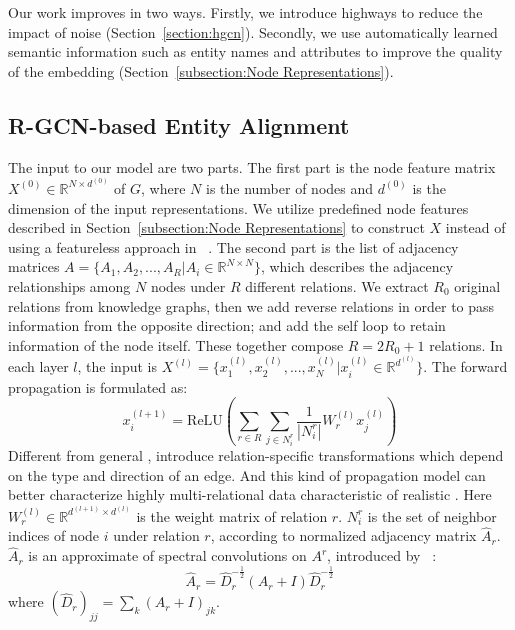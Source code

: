 Our work improves \RGCNs in two ways. Firstly, we introduce highways to reduce the impact of noise (Section~\ref{section:hgcn}).
    Secondly, we use automatically learned semantic information such as entity names and attributes to improve the quality of the \KG
    embedding (Section~\ref{subsection:Node Representations}).




	
	
	\subsection{R-GCN-based Entity Alignment}
	\label{section:rgcn}	

	The input to our \RGCN model are two parts. The first part is the node feature matrix $X^{(0)} \in \mathbb{R}^{N \times d^{(0)}}$ of $G$, where $N$ is the number of nodes and $d^{(0)}$ is the dimension of the input representations. We utilize predefined node features described in Section~\ref{subsection:Node Representations} to construct $X$ instead of using a featureless approach in \RGCNs~\cite{Schlichtkrull2017Modeling}.
	The second part is the list of adjacency matrices $A=\{A_1,A_2,...,A_R |A_i \in \mathbb{R}^{N \times N} \}$, which describes the adjacency relationships among $N$ nodes under $R$ different relations. We extract $R_0$ original relations from knowledge graphs, then we add reverse relations in order to pass information from the opposite direction; and add the self loop to retain information of the node itself. These together compose $R=2R_0+1$ relations.
	In each layer $l$, the input is $X^{(l)} = \{x^{(l)}_1,x^{(l)}_2,...,x^{(l)}_{N} |x^{(l)}_{i} \in \mathbb{R}^{d^{(l)}}\}$. The forward propagation is formulated as:
	\begin{equation}
	x_i^{(l+1)}=\mathrm{ReLU} (\sum\limits_{r \in R}\sum\limits_{j \in N_i^r}\frac{1}{|N_i^r|}W_r^{(l)}x_j^{(l)})
	\end{equation}
	Different from general \GCNs, \RGCNs introduce relation-specific transformations which depend on the type and direction of an edge. And this kind of propagation model can better characterize highly multi-relational data characteristic of realistic \KGs. Here $W_r^{(l)} \in \mathbb{R}^{d^{(l+1)} \times d^{(l)}}$ is the weight matrix of relation $r$. $N_i^r$ is the set of neighbor indices of node $i$ under relation $r$, according to normalized adjacency matrix $\hat A_r$. $\hat A_r$ is an approximate of spectral convolutions on $A^r$, introduced by ~\cite{Kipf2016Semi}:
	\begin{equation}
	\hat A_r=\hat D_r^{- \frac{1}{2}}(A_r+I)\hat D_r^{- \frac{1}{2}}
	\end{equation}
	where $(\hat D_r)_{jj}=\sum_k(A_r+I)_{jk}$.
	

